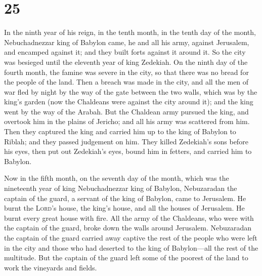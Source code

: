 \hypertarget{section-24}{%
\section{25}\label{section-24}}

 In the ninth year of his reign, in the tenth month, in
the tenth day of the month, Nebuchadnezzar king of Babylon came, he and
all his army, against Jerusalem, and encamped against it; and they built
forts against it around it.  So the city was besieged
until the eleventh year of king Zedekiah.  On the ninth
day of the fourth month, the famine was severe in the city, so that
there was no bread for the people of the land.  Then a
breach was made in the city, and all the men of war fled by night by the
way of the gate between the two walls, which was by the king's garden
(now the Chaldeans were against the city around it); and the king went
by the way of the Arabah.  But the Chaldean army pursued
the king, and overtook him in the plains of Jericho; and all his army
was scattered from him.  Then they captured the king and
carried him up to the king of Babylon to Riblah; and they passed
judgement on him.  They killed Zedekiah's sons before his
eyes, then put out Zedekiah's eyes, bound him in fetters, and carried
him to Babylon.

 Now in the fifth month, on the seventh day of the month,
which was the nineteenth year of king Nebuchadnezzar king of Babylon,
Nebuzaradan the captain of the guard, a servant of the king of Babylon,
came to Jerusalem.  He burnt the \textsc{Lord}'s house,
the king's house, and all the houses of Jerusalem. He burnt every great
house with fire.  All the army of the Chaldeans, who were
with the captain of the guard, broke down the walls around Jerusalem.
 Nebuzaradan the captain of the guard carried away
captive the rest of the people who were left in the city and those who
had deserted to the king of Babylon---all the rest of the multitude.
 But the captain of the guard left some of the poorest of
the land to work the vineyards and fields.

